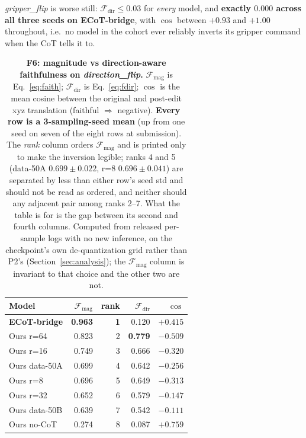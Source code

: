 \documentclass{article}
\begin{document}
\emph{gripper\_flip} is worse still: $\mathcal{F}_{\text{dir}} \leq 0.03$ for \emph{every} model, and \textbf{exactly $0.000$ across all three seeds on ECoT-bridge}, with $\cos$ between $+0.93$ and $+1.00$ throughout, i.e.\ no model in the cohort ever reliably inverts its gripper command when the CoT tells it to.

\begin{table}[t]
\centering\small
\caption{\textbf{F6: magnitude vs direction-aware faithfulness on \emph{direction\_flip}.} $\mathcal{F}_{\text{mag}}$ is Eq.~\ref{eq:faith}; $\mathcal{F}_{\text{dir}}$ is Eq.~\ref{eq:fdir}; $\cos$ is the mean cosine between the original and post-edit xyz translation (faithful $\Rightarrow$ negative). \textbf{Every row is a 3-sampling-seed mean} (up from one seed on seven of the eight rows at submission). The \emph{rank} column orders $\mathcal{F}_{\text{mag}}$ and is printed only to make the inversion legible; ranks 4 and 5 (data-50A $0.699 \pm 0.022$, r=8 $0.696 \pm 0.041$) are separated by less than either row's seed std and should not be read as ordered, and neither should any adjacent pair among ranks 2--7. What the table is for is the gap between its second and fourth columns. Computed from released per-sample logs with no new inference, on the checkpoint's own de-quantization grid rather than P2's (Section~\ref{sec:analysis}); the $\mathcal{F}_{\text{mag}}$ column is invariant to that choice and the other two are not.}
\label{tab:directional}
\begin{tabular}{l r r r r}
\toprule
Model & $\mathcal{F}_{\text{mag}}$ & rank & $\mathcal{F}_{\text{dir}}$ & $\cos$ \\
\midrule
\textbf{ECoT-bridge} & \textbf{0.963} & \textbf{1} & 0.120 & $+0.415$ \\
Ours r=64      & 0.823 & 2 & \textbf{0.779} & $-0.509$ \\
Ours r=16      & 0.749 & 3 & 0.666 & $-0.320$ \\
Ours data-50A  & 0.699 & 4 & 0.642 & $-0.256$ \\
Ours r=8       & 0.696 & 5 & 0.649 & $-0.313$ \\
Ours r=32      & 0.652 & 6 & 0.579 & $-0.147$ \\
Ours data-50B  & 0.639 & 7 & 0.542 & $-0.111$ \\
Ours no-CoT    & 0.274 & 8 & 0.087 & $+0.759$ \\
\bottomrule
\end{tabular}
\end{table}
\end{document}

